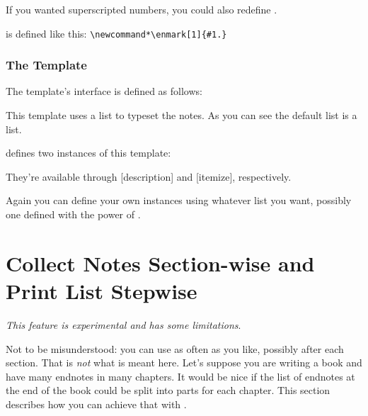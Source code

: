 \documentclass[toc=bib,toc=index]{cnpkgdoc}
\begin{document}
If you wanted superscripted numbers, you could also redefine . 
\begin{beschreibung}
  is defined like this: \verb=\newcommand*\enmark[1]{#1.}=
\end{beschreibung}

\subsubsection{The  Template}
The  template's interface is defined as follows:
This template uses a list to typeset the notes. As you can see the default list
is a  list.

\enotez defines two instances of this template:
\begin{beispiel}
\end{beispiel}
They're available through [description] and
[itemize], respectively.

Again you can define your own instances using whatever list you want, possibly
one defined with the power of .

\section{Collect Notes Section-wise and Print List Stepwise}\label{sec:split}
\emph{This feature is experimental and has some limitations}.

Not to be misunderstood: you can use  as often as you like,
possibly after each section. That is \emph{not} what is meant here. Let's
suppose you are writing a book and have many endnotes in many chapters. It
would be nice if the list of endnotes at the end of the book could be split
into parts for each chapter. This section describes how you can achieve that with
\enotez.
\end{document}

